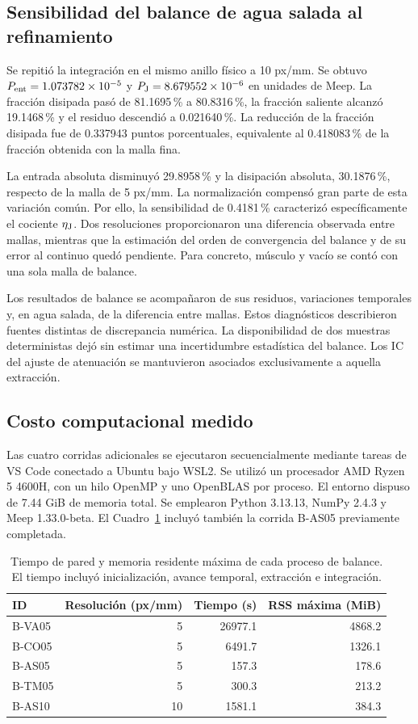 \subsection{Sensibilidad del balance de agua salada al refinamiento}
Se repitió la integración en el mismo anillo físico a 10 px/mm. Se obtuvo $P_{\rm ent}=1.073782\times10^{-5}$ y $P_{\rm J}=8.679552\times10^{-6}$ en unidades de Meep. La fracción disipada pasó de 81.1695\,\% a 80.8316\,\%, la fracción saliente alcanzó 19.1468\,\% y el residuo descendió a 0.021640\,\%. La reducción de la fracción disipada fue de 0.337943 puntos porcentuales, equivalente al 0.418083\,\% de la fracción obtenida con la malla fina.

La entrada absoluta disminuyó 29.8958\,\% y la disipación absoluta, 30.1876\,\%, respecto de la malla de 5 px/mm. La normalización compensó gran parte de esta variación común. Por ello, la sensibilidad de 0.4181\,\% caracterizó específicamente el cociente $\eta_{\rm J}$. Dos resoluciones proporcionaron una diferencia observada entre mallas, mientras que la estimación del orden de convergencia del balance y de su error al continuo quedó pendiente. Para concreto, músculo y vacío se contó con una sola malla de balance.

Los resultados de balance se acompañaron de sus residuos, variaciones temporales y, en agua salada, de la diferencia entre mallas. Estos diagnósticos describieron fuentes distintas de discrepancia numérica. La disponibilidad de dos muestras deterministas dejó sin estimar una incertidumbre estadística del balance. Los IC del ajuste de atenuación se mantuvieron asociados exclusivamente a aquella extracción.

\clearpage
\subsection{Costo computacional medido}\label{sec:costo-balance}
Las cuatro corridas adicionales se ejecutaron secuencialmente mediante tareas de VS Code conectado a Ubuntu bajo WSL2. Se utilizó un procesador AMD Ryzen 5 4600H, con un hilo OpenMP y uno OpenBLAS por proceso. El entorno dispuso de 7.44 GiB de memoria total. Se emplearon Python 3.13.13, NumPy 2.4.3 y Meep 1.33.0-beta. El Cuadro~\ref{tab:balance-costo} incluyó también la corrida B-AS05 previamente completada.

\begin{table}[htbp]\centering\small
\caption{Tiempo de pared y memoria residente máxima de cada proceso de balance. El tiempo incluyó inicialización, avance temporal, extracción e integración.}\label{tab:balance-costo}
\begin{tabular}{lrrr}\hline
ID & Resolución (px/mm) & Tiempo (s) & RSS máxima (MiB) \\ \hline
B-VA05 & 5 & 26977.1 & 4868.2 \\
B-CO05 & 5 & 6491.7 & 1326.1 \\
B-AS05 & 5 & 157.3 & 178.6 \\
B-TM05 & 5 & 300.3 & 213.2 \\
B-AS10 & 10 & 1581.1 & 384.3 \\ \hline
\end{tabular}\end{table}

